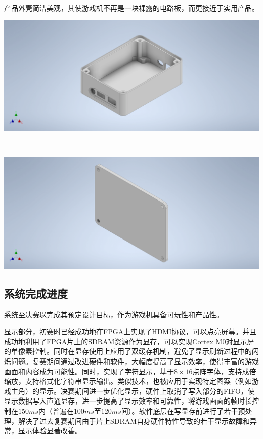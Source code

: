 产品外壳简洁美观，其使游戏机不再是一块裸露的电路板，而更接近于实用产品。


\begin{Figure}[自制产品外壳]
    \begin{FigureSub}[外壳主体]
        \includegraphics[width=15cm]{image/PrismGCNew_3D.pdf}
    \end{FigureSub}\\ \vspace{0.5cm}
    \begin{FigureSub}[外壳上盖]
        \includegraphics[width=15cm]{image/002_3D.pdf}
    \end{FigureSub}
\end{Figure}


\subsection{系统完成进度}
系统至决赛以完成其预定设计目标，作为游戏机具备可玩性和产品性。

显示部分，初赛时已经成功地在FPGA上实现了HDMI协议，可以点亮屏幕。并且成功地利用了FPGA片上的SDRAM资源作为显存，可以实现Cortex M0对显示屏的单像素控制。同时在显存使用上应用了双缓存机制，避免了显示刷新过程中的闪烁问题。复赛期间通过改进硬件和软件，大幅度提高了显示效率，使得丰富的游戏画面和内容成为可能性。同时，实现了字符显示，基于$8\times 16$点阵字体，支持成倍缩放，支持格式化字符串显示输出。类似技术，也被应用于实现特定图案（例如游戏主角）的显示。决赛期间进一步优化显示，硬件上取消了写入部分的FIFO，使显示数据写入直通显存，进一步提高了显示效率和可靠性，将游戏画面的帧时长控制在$150\si{ms}$内（普遍在$100\si{ms}$至$120\si{ms}$间）。软件底层在写显存前进行了若干预处理，解决了过去复赛期间由于片上SDRAM自身硬件特性导致的若干显示故障和异常，显示体验显著改善。

